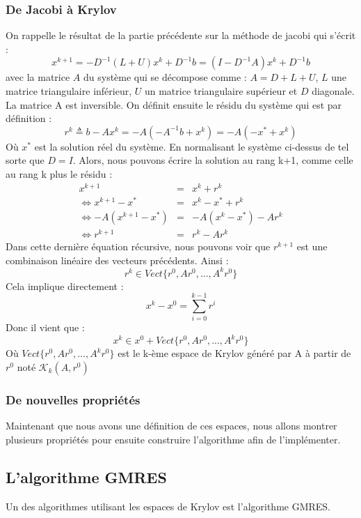 \subsubsection{De Jacobi à Krylov}
On rappelle le résultat de la partie précédente sur la méthode de jacobi qui s'écrit : 
\begin{equation}
x^{k+1} = -D^{-1}(L+U)x^k + D^{-1}b = (I - D^{-1}A)x^{k} + D^{-1}b
\end{equation}
avec la matrice $A$ du système qui se décompose comme : $A = D + L + U$, $L$ une matrice triangulaire inférieur, $U$ un matrice triangulaire supérieur et $D$ diagonale. La matrice A est inversible. On définit ensuite le résidu du système qui est par définition : 
\begin{equation}
r^k \triangleq b - Ax^k = -A ( - A^{-1}b + x^k) = -A (- x^* + x^k)
\end{equation}
Où $x^*$ est la solution réel du système. En normalisant le système ci-dessus de tel sorte que $D = I$. Alors, nous pouvons écrire la solution au rang k+1, comme celle au rang k plus le résidu : 
\begin{eqnarray}
x^{k+1} &=& x^k + r^k\\
\Leftrightarrow x^{k+1} - x^* &=& x^k - x^* + r^k\\
\Leftrightarrow -A( x^{k+1} - x^*) &=& -A(x^k - x^*) - Ar^k\\
\Leftrightarrow r^{k+1} &=& r^k - Ar^k
\end{eqnarray}
Dans cette dernière équation récursive, nous pouvons voir que $r^{k+1}$ est une combinaison linéaire des vecteurs précédents. Ainsi :
\begin{equation}
r^k \in Vect\{r^0, Ar^0, ..., A^kr^0\}
\end{equation}
Cela implique directement : 
\begin{equation}
x^k - x^0 = \sum_{i = 0}^{k-1}r^i
\end{equation}
Donc il vient que : 
\begin{equation}
x^k \in x^0 + Vect\{r^0, Ar^0, ..., A^kr^0\}
\end{equation}
Où $Vect\{r^0, Ar^0, ..., A^kr^0\}$ est le k-ème espace de Krylov généré par A à partir de $r^0$ noté $\mathcal{K}_k(A, r^0)$
\subsubsection{De nouvelles propriétés}
Maintenant que nous avons une définition de ces espaces, nous allons montrer plusieurs propriétés pour ensuite construire l'algorithme afin de l'implémenter. 
\subsection{L'algorithme GMRES}
Un des algorithmes utilisant les espaces de Krylov est l'algorithme GMRES.
